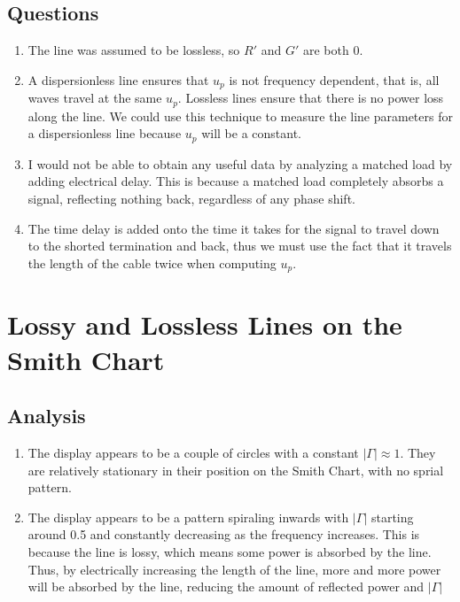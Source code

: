 \documentclass{article}
\begin{document}
\subsection{Questions}

\begin{enumerate}
	\item The line was assumed to be lossless, so $R'$ and $G'$ are both 0.
	\item A dispersionless line ensures that $u_p$ is not frequency dependent, that is, all waves travel at the same $u_p$. Lossless lines ensure that there is no power loss along the line. We could use this technique to measure the line parameters for a dispersionless line because $u_p$ will be a constant.
	\item I would not be able to obtain any useful data by analyzing a matched load by adding electrical delay. This is because a matched load completely absorbs a signal, reflecting nothing back, regardless of any phase shift.
	\item The time delay is added onto the time it takes for the signal to travel down to the shorted termination and back, thus we must use the fact that it travels the length of the cable twice when computing $u_p$.
\end{enumerate}


\section{Lossy and Lossless Lines on the Smith Chart}

\subsection{Analysis}
\begin{enumerate}
	\item The display appears to be a couple of circles with a constant $\vert\Gamma\vert\approx 1$. They are relatively stationary in their position on the Smith Chart, with no sprial pattern.
	\item The display appears to be a pattern spiraling inwards with $\vert\Gamma\vert$ starting around 0.5 and constantly decreasing as the frequency increases. This is because the line is lossy, which means some power is absorbed by the line. Thus, by electrically increasing the length of the line, more and more power will be absorbed by the line, reducing the amount of reflected power and $\vert\Gamma\vert$
\end{enumerate}
\end{document}

